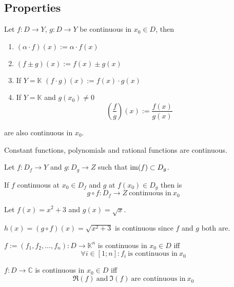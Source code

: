\subsection{Properties}
\begin{proposition}
   Let \(f: D \to Y\), \(g: D \to Y\) be continuous in \(x_0 \in D\), then
   \begin{enumerate}[label=\roman*, align=Center]
      \item \((\alpha \cdot f)(x) := \alpha \cdot f(x)\)
      \item \((f \pm g)(x) := f(x) \pm g(x)\)
      \item If \(Y = \mathbb{K}\) \((f \cdot g)(x) := f(x) \cdot g(x)\)
      \item If \(Y = \mathbb{K}\) and \(g(x_0) \neq 0\)
         \[\left(\frac{f}{g}\right)(x) := \frac{f(x)}{g(x)}\]
   \end{enumerate}
   are also continuous in \(x_0\).
\end{proposition}

\begin{corollary}
   Constant functions, polynomials and rational functions are continuous.
\end{corollary}

\begin{proposition}\label{pro:contin_continuation}
   Let \(f: D_f \to Y\) and \(g: D_g \to Z\) such that \(\operatorname{im}(f) \subset D_g\).

   If \(f\) continuous at \(x_0 \in D_f\) and \(g\) at \(f(x_0) \in D_g\) then is
   \[g \circ f: D_f \to Z~\text{continuous in}~x_0\]
\end{proposition}
\begin{example}
   Let \(f(x) = x^2 + 3\) and \(g(x) = \sqrt{x}\).

   \(h(x) = (g \circ f)(x) = \sqrt{x^2 + 3}\) is continuous since \(f\) and \(g\) both are.
\end{example}

\begin{theorem}
   \(f := (f_1, f_2, \ldots, f_n): D \to \mathbb{K}^n\) is continuous in \(x_0 \in D\) iff
   \[\forall i \in [1; n]: f_i~\text{is continuous in}~x_0\]
\end{theorem}

\begin{theorem}
   \(f: D \to \mathbb{C}\) is continuous in \(x_0 \in D\) iff
   \[\Re(f)~\text{and}~\Im(f)~\text{are continuous in}~x_0\]
\end{theorem}

